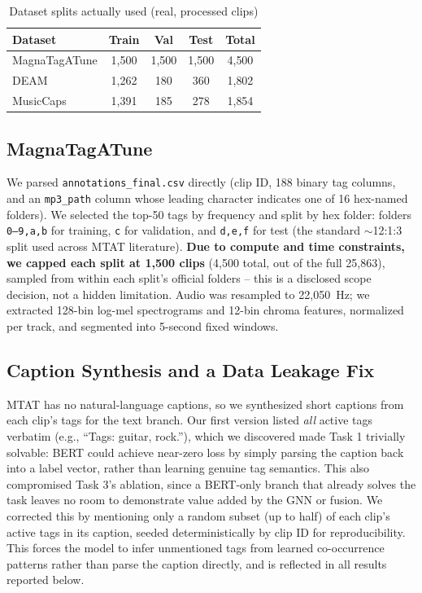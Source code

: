 \documentclass[conference]{IEEEtran}
\begin{document}
\begin{table}[h]
\centering
\caption{Dataset splits actually used (real, processed clips)}
\label{tab:datasets}
\begin{tabular}{lcccc}
\toprule
Dataset & Train & Val & Test & Total \\
\midrule
MagnaTagATune & 1{,}500 & 1{,}500 & 1{,}500 & 4{,}500 \\
DEAM & 1{,}262 & 180 & 360 & 1{,}802 \\
MusicCaps & 1{,}391 & 185 & 278 & 1{,}854 \\
\bottomrule
\end{tabular}
\end{table}

\subsection{MagnaTagATune}
We parsed \texttt{annotations\_final.csv} directly (clip ID, 188 binary
tag columns, and an \texttt{mp3\_path} column whose leading character
indicates one of 16 hex-named folders). We selected the top-50 tags by
frequency and split by hex folder: folders \texttt{0--9,a,b} for
training, \texttt{c} for validation, and \texttt{d,e,f} for test (the
standard $\sim$12:1:3 split used across MTAT literature). \textbf{Due
to compute and time constraints, we capped each split at 1{,}500
clips} (4{,}500 total, out of the full 25{,}863), sampled from within
each split's official folders -- this is a disclosed scope decision,
not a hidden limitation. Audio was resampled to 22{,}050~Hz; we
extracted 128-bin log-mel spectrograms and 12-bin chroma features,
normalized per track, and segmented into 5-second fixed windows.

\subsection{Caption Synthesis and a Data Leakage Fix}
\label{sec:leakage}
MTAT has no natural-language captions, so we synthesized short captions
from each clip's tags for the text branch. Our first version listed
\emph{all} active tags verbatim (e.g., ``Tags: guitar, rock.''), which
we discovered made Task 1 trivially solvable: BERT could achieve near-zero
loss by simply parsing the caption back into a label vector, rather
than learning genuine tag semantics. This also compromised Task 3's
ablation, since a BERT-only branch that already solves the task leaves
no room to demonstrate value added by the GNN or fusion. We corrected
this by mentioning only a random subset (up to half) of each clip's
active tags in its caption, seeded deterministically by clip ID for
reproducibility. This forces the model to infer unmentioned tags from
learned co-occurrence patterns rather than parse the caption directly,
and is reflected in all results reported below.
\end{document}
